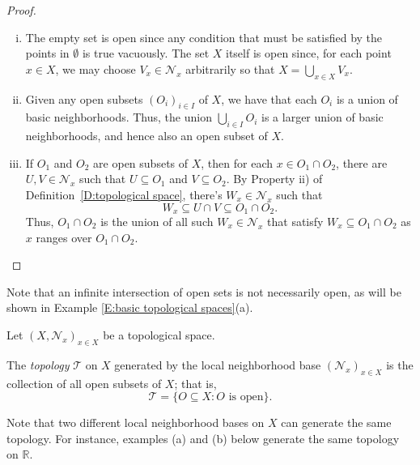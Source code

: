 \documentclass{scrartcl}
\begin{document}
\begin{proof}

\leavevmode

\begin{enumerate}[i)]
\item The empty set is open since any condition that must be satisfied by the points in $\emptyset$ is true vacuously. The set $X$ itself is open since, for each point $x\in X$, we may choose $V_x\in \mathscr{N}_x$ arbitrarily so that $X=\bigcup\limits_{x\in X}V_x$.

\item Given any open subsets $(O_i)_{i\in I}$ of $X$, we have that each $O_i$ is a union of basic neighborhoods. Thus, the union $\bigcup\limits_{i\in I}O_i$ is a larger union of basic neighborhoods, and hence also an open subset of $X$.

\item If $O_1$ and $O_2$ are open subsets of $X$, then for each $x\in O_1\cap O_2$, there are $U,V\in \mathscr{N}_x$ such that $U\subseteq O_1$ and $V\subseteq O_2$. By Property ii) of Definition~\ref{D:topological space}, there's $W_x\in \mathscr{N}_x$ such that \[W_x\subseteq U\cap V\subseteq O_1\cap O_2\text{.}\] Thus, $O_1\cap O_2$ is the union of all such $W_x\in \mathscr{N}_x$ that satisfy $W_x\subseteq O_1\cap O_2$ as $x$ ranges over $O_1\cap O_2$.
\end{enumerate}
\end{proof}

Note that an infinite intersection of open sets is not necessarily open, as will be shown in Example \ref{E:basic topological spaces}(a).

\begin{definition}
Let $(X, \mathscr{N}_x)_{x\in X}$ be a topological space.

The \emph{topology} $\mathscr{T}$ on $X$ generated by the local neighborhood base $(\mathscr{N}_x)_{x\in X}$  is the collection of all open subsets of $X$; that is, 
\[
\mathscr{T}= 
\{ O\subseteq X \colon O \text{ is open}\}\text{.}
\]
\end{definition}

Note that two different local neighborhood bases on $X$ can generate the same topology. For instance, examples (a) and (b) below generate the same topology on $\mathbb R$.
\end{document}
